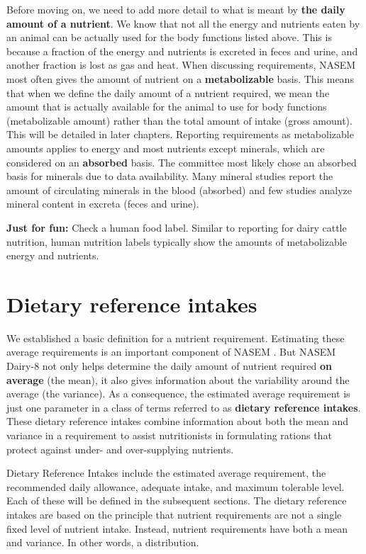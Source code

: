 \documentclass[
]{book}
\begin{document}
Before moving on, we need to add more detail to what is meant by \textbf{the daily amount of a nutrient}. We know that not all the energy and nutrients eaten by an animal can be actually used for the body functions listed above. This is because a fraction of the energy and nutrients is excreted in feces and urine, and another fraction is lost as gas and heat. When discussing requirements, NASEM \citeyearpar{NASEM8} most often gives the amount of nutrient on a \textbf{metabolizable} basis. This means that when we define the daily amount of a nutrient required, we mean the amount that is actually available for the animal to use for body functions (metabolizable amount) rather than the total amount of intake (gross amount). This will be detailed in later chapters. Reporting requirements as metabolizable amounts applies to energy and most nutrients except minerals, which are considered on an \textbf{absorbed} basis. The committee most likely chose an absorbed basis for minerals due to data availability. Many mineral studies report the amount of circulating minerals in the blood (absorbed) and few studies analyze mineral content in excreta (feces and urine).

\textbf{Just for fun: }
Check a human food label. Similar to reporting for dairy cattle nutrition, human nutrition labels typically show the amounts of metabolizable energy and nutrients.

\hypertarget{dietary-reference-intakes}{%
\section{Dietary reference intakes}\label{dietary-reference-intakes}}

We established a basic definition for a nutrient requirement. Estimating these average requirements is an important component of NASEM \citeyearpar{NASEM8}. But NASEM Dairy-8 \citeyearpar{NASEM8} not only helps determine the daily amount of nutrient required \textbf{on average} (the mean), it also gives information about the variability around the average (the variance). As a consequence, the estimated average requirement is just one parameter in a class of terms referred to as \textbf{dietary reference intakes}. These dietary reference intakes combine information about both the mean and variance in a requirement to assist nutritionists in formulating rations that protect against under- and over-supplying nutrients.

Dietary Reference Intakes include the estimated average requirement, the recommended daily allowance, adequate intake, and maximum tolerable level. Each of these will be defined in the subsequent sections. The dietary reference intakes are based on the principle that nutrient requirements are not a single fixed level of nutrient intake. Instead, nutrient requirements have both a mean and variance. In other words, a distribution.
\end{document}
